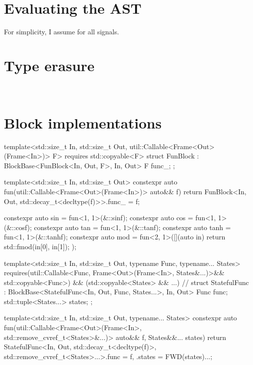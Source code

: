 \section{Evaluating the AST}
For simplicity, I assume  for all signals. \subsection{}

\section{Type erasure}
\\

\section{Block implementations}

\begin{cppcodenl}
  template<std::size_t In, std::size_t Out, util::Callable<Frame<Out>(Frame<In>)> F>
  requires std::copyable<F>
  struct FunBlock : BlockBase<FunBlock<In, Out, F>, In, Out> {
    F func_;
  };

  template<std::size_t In, std::size_t Out>
  constexpr auto fun(util::Callable<Frame<Out>(Frame<In>)> auto&& f)
  {
    return FunBlock<In, Out, std::decay_t<decltype(f)>>{.func_ = f};
  }

  constexpr auto sin = fun<1, 1>(&::sinf);
  constexpr auto cos = fun<1, 1>(&::cosf);
  constexpr auto tan = fun<1, 1>(&::tanf);
  constexpr auto tanh = fun<1, 1>(&::tanhf);
  constexpr auto mod = fun<2, 1>([](auto in) { return std::fmod(in[0], in[1]); });
\end{cppcodenl}

\begin{cppcodenl}
  template<std::size_t In, std::size_t Out, typename Func, typename... States>
  requires(util::Callable<Func, Frame<Out>(Frame<In>, States&...)>&& std::copyable<Func>) &&
    (std::copyable<States> && ...) //
    struct StatefulFunc : BlockBase<StatefulFunc<In, Out, Func, States...>, In, Out> {
    Func func;
    std::tuple<States...> states;
  };

  template<std::size_t In, std::size_t Out, typename... States>
  constexpr auto fun(util::Callable<Frame<Out>(Frame<In>, std::remove_cvref_t<States>&...)> auto&& f,
                     States&&... states)
  {
    return StatefulFunc<In, Out, std::decay_t<decltype(f)>, std::remove_cvref_t<States>...>{.func = f,
                                                                                            .states = {FWD(states)...}};
  }
\end{cppcodenl}

